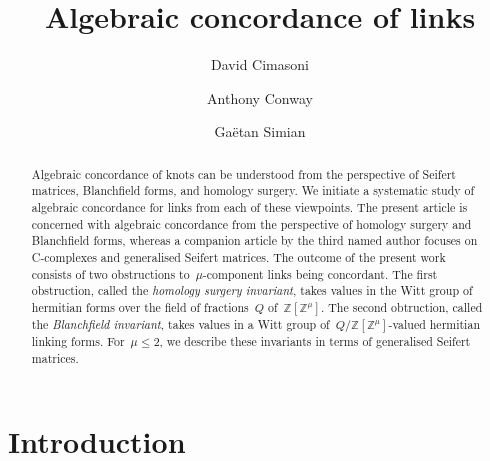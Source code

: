 \documentclass[10.9pt,a4paper]{amsart}
\title{Algebraic concordance of links}
\author[D.~Cimasoni]{David Cimasoni}
\author[A.~Conway]{Anthony Conway}
\author[G.~Simian]{Ga\"etan Simian}
\theoremstyle{definition}
\theoremstyle{remark}
\newcommand{\Z}{\mathbb{Z}}
\begin{document}
\maketitle

%
%
\begin{abstract}
Algebraic concordance of knots can be understood from the perspective of Seifert matrices,  Blanchfield forms,  and homology surgery.
We initiate a systematic study of algebraic concordance for links from each of these viewpoints.
The present article is concerned with algebraic concordance from the perspective of homology surgery and Blanchfield forms, whereas a companion article by the third named author focuses on C-complexes and generalised Seifert matrices.
The outcome of the present work consists of two obstructions to~$\mu$-component links being concordant.
The first obstruction, called the {\em homology surgery invariant\/}, takes values in the Witt group of hermitian forms over the field of fractions~$Q$ of~$\Z[\Z^\mu]$.
 The second obtruction, called the {\em Blanchfield invariant\/}, takes values in a Witt group of~$Q/\Z[\Z^\mu]$-valued hermitian linking forms.
For~$\mu\le 2$, we describe these invariants in terms of generalised Seifert matrices.
\end{abstract}



\section{Introduction}
\end{document}
